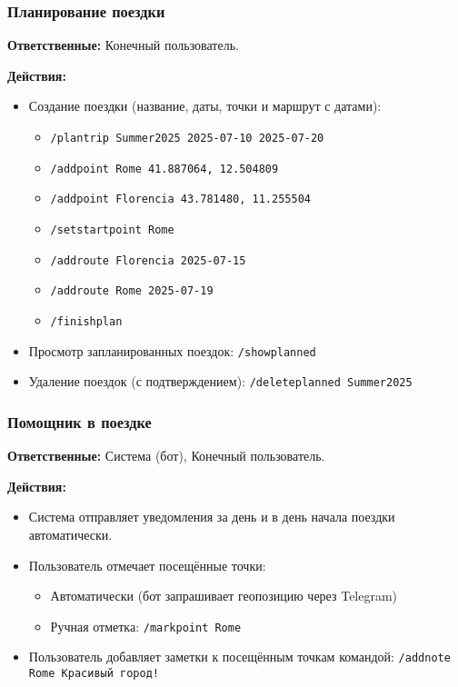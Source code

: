 \documentclass[areasetadvanced]{scrartcl}
\begin{document}
\subsubsection{Планирование поездки}
\textbf{Ответственные:} Конечный пользователь.

\textbf{Действия:}
\begin{itemize}
  \item Создание поездки (название, даты, точки и маршрут с датами):
  \begin{itemize}
    \item \texttt{/plantrip Summer2025 2025-07-10 2025-07-20}
    \item \texttt{/addpoint Rome 41.887064, 12.504809}
    \item \texttt{/addpoint Florencia 43.781480, 11.255504}
    \item \texttt{/setstartpoint Rome}
    \item \texttt{/addroute Florencia 2025-07-15}
    \item \texttt{/addroute Rome 2025-07-19}
    \item \texttt{/finishplan}
  \end{itemize}
  \item Просмотр запланированных поездок: \texttt{/showplanned}
  \item Удаление поездок (с подтверждением): \texttt{/deleteplanned Summer2025}
\end{itemize}

\subsubsection{Помощник в поездке}
\textbf{Ответственные:} Система (бот), Конечный пользователь.

\textbf{Действия:}
\begin{itemize}
  \item Система отправляет уведомления за день и в день начала поездки автоматически.
  \item Пользователь отмечает посещённые точки:
  \begin{itemize}
    \item Автоматически (бот запрашивает геопозицию через Telegram)
    \item Ручная отметка: \texttt{/markpoint Rome}
  \end{itemize}
  \item Пользователь добавляет заметки к посещённым точкам командой: \texttt{/addnote Rome Красивый город!}
\end{itemize}
\end{document}
